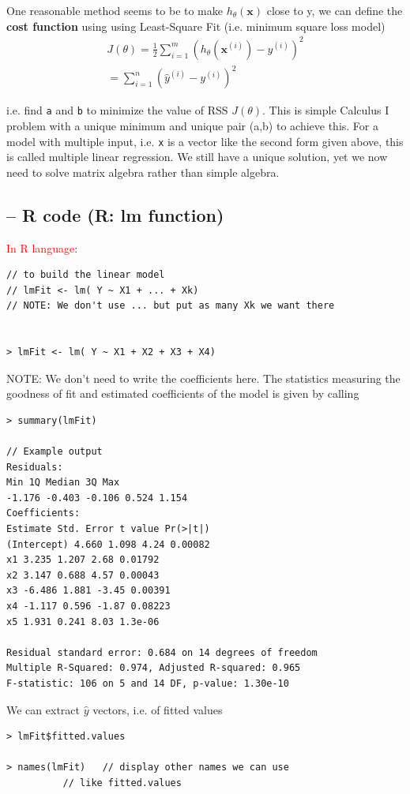 One reasonable method seems to be to make $h_\theta(\mathbf{x})$ close to y, we
can define the {\bf cost function} using using Least-Square Fit (i.e. minimum
square loss model)
\begin{equation}
\begin{split}
J(\theta) = \frac{1}{2} \sum_{i=1}^m \left( h_\theta(\mathbf{x}^{(i)}) -
y^{(i)}\right)^2  \\
= \sum^n_{i=1} \left( \hat{y}^{(i)} - y^{(i)}\right)^2
\end{split}
\end{equation}


i.e. find \verb!a! and \verb!b! to minimize the value of RSS $J(\theta)$. This
is simple Calculus I problem  with a unique minimum and unique pair (a,b) to
achieve this.
For a model with multiple input, i.e. \verb!x! is a vector like the second form
given above, this is called multiple linear regression. We still have a unique
solution, yet we now need to solve matrix algebra rather than simple algebra.

\subsection{-- R code  (R: lm function)}

\textcolor{red}{In R language}:
\begin{verbatim}
// to build the linear model
// lmFit <- lm( Y ~ X1 + ... + Xk)
// NOTE: We don't use ... but put as many Xk we want there


> lmFit <- lm( Y ~ X1 + X2 + X3 + X4)
\end{verbatim}
NOTE: We don't need to write the coefficients here. The statistics measuring the
goodness of fit and estimated coefficients of the model is given by calling
\begin{verbatim}
> summary(lmFit)

// Example output
Residuals:
Min 1Q Median 3Q Max
-1.176 -0.403 -0.106 0.524 1.154
Coefficients:
Estimate Std. Error t value Pr(>|t|)
(Intercept) 4.660 1.098 4.24 0.00082
x1 3.235 1.207 2.68 0.01792
x2 3.147 0.688 4.57 0.00043
x3 -6.486 1.881 -3.45 0.00391
x4 -1.117 0.596 -1.87 0.08223
x5 1.931 0.241 8.03 1.3e-06

Residual standard error: 0.684 on 14 degrees of freedom
Multiple R-Squared: 0.974, Adjusted R-squared: 0.965
F-statistic: 106 on 5 and 14 DF, p-value: 1.30e-10
\end{verbatim}

We can extract $\hat{y}$ vectors, i.e. of fitted values
\begin{verbatim}
> lmFit$fitted.values

> names(lmFit)   // display other names we can use
          // like fitted.values
\end{verbatim}


